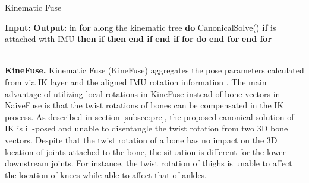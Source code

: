 \documentclass[lettersize,journal]{IEEEtran}
\begin{document}
\begin{algorithm}[t] 
\caption{Kinematic Fuse}
\begin{algorithmic}
\STATE \textbf{Input:} 
\STATE \textbf{Output:} 
\STATE \hspace{0.5cm}  in  
\STATE \hspace{0.5cm} 
\STATE \hspace{0.5cm} \textbf{for}  along the kinematic tree \textbf{do}
\STATE \hspace{1cm} 
\STATE \hspace{1cm}  CanonicalSolve()
\STATE \hspace{1cm} \textbf{if}  is attached with IMU  \textbf{then}
\STATE \hspace{1.5cm} 
\STATE \hspace{1.5cm}   
\STATE \hspace{1.5cm} \textbf{if}  \textbf{then}
\STATE \hspace{2.0cm} 
\STATE \hspace{1.5cm} \textbf{end if}
\STATE \hspace{1cm} \textbf{end if}
\STATE \hspace{1cm} 
\STATE \hspace{1cm} \textbf{for}  \textbf{do}
\STATE \hspace{1.5cm} 
\STATE \hspace{1.5cm} 
\STATE \hspace{1cm} \textbf{end for}
\STATE \hspace{0.5cm} \textbf{end for}
\STATE \hspace{0.5cm} 
\STATE \hspace{0.5cm} 
\end{algorithmic}
\label{alg1}
\end{algorithm}

~\\
\noindent \textbf{KineFuse.}
\quad Kinematic Fuse (KineFuse) aggregates the pose parameters  calculated from  via IK layer and the aligned IMU rotation information . The main advantage of utilizing local rotations in KineFuse instead of bone vectors in NaiveFuse is that the twist rotations of bones can be compensated in the IK process. As described in section \ref{subsec:pre}, the proposed canonical solution of IK is ill-posed and unable to disentangle the twist rotation from two 3D bone vectors. Despite that the twist rotation of a bone has no impact on the 3D location of joints attached to the bone, the situation is different for the lower downstream joints. For instance, the twist rotation of thighs is unable to affect the location of knees while able to affect that of ankles. 
\end{document}
